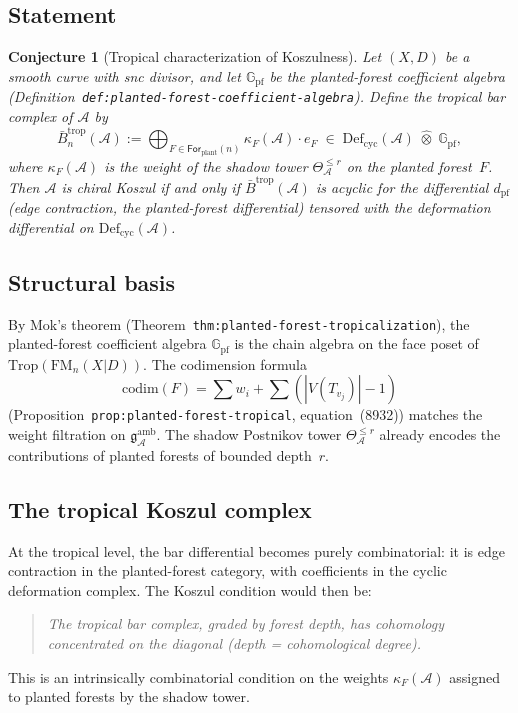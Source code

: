 \documentclass[11pt]{article}
\newcommand{\cA}{\mathcal{A}}
\newcommand{\bG}{\mathbb{G}}
\newcommand{\fg}{\mathfrak{g}}
\newcommand{\FM}{\mathrm{FM}}
\newcommand{\Trop}{\mathrm{Trop}}
\newcommand{\barB}{\bar{B}}
\newcommand{\Def}{\mathrm{Def}}
\theoremstyle{plain}
\newtheorem{conjecture}{Conjecture}[section]
\theoremstyle{definition}
\theoremstyle{remark}
\begin{document}
\subsection{Statement}

\begin{conjecture}[Tropical characterization of Koszulness]
\label{conj:tropical-koszul}
Let $(X,D)$ be a smooth curve with snc divisor, and let
$\bG_{\mathrm{pf}}$ be the planted-forest coefficient algebra
(Definition~\texttt{def:planted-forest-coefficient-algebra}).
Define the \emph{tropical bar complex} of $\cA$ by
\[
\barB^{\mathrm{trop}}_n(\cA)
:= \bigoplus_{F \in \mathsf{For}_{\mathrm{plant}}(n)}
   \kappa_F(\cA) \cdot e_F
\;\in\;
\Def_{\mathrm{cyc}}(\cA) \;\widehat{\otimes}\; \bG_{\mathrm{pf}},
\]
where $\kappa_F(\cA)$ is the weight of the shadow tower
$\Theta^{\leq r}_\cA$ on the planted forest~$F$.
Then $\cA$ is chiral Koszul if and only if
$\barB^{\mathrm{trop}}(\cA)$ is acyclic for the differential
$d_{\mathrm{pf}}$ (edge contraction, the planted-forest differential) tensored with the
deformation differential on $\Def_{\mathrm{cyc}}(\cA)$.
\end{conjecture}

\subsection{Structural basis}

By Mok's theorem (Theorem~\texttt{thm:planted-forest-tropicalization}),
the planted-forest coefficient algebra $\bG_{\mathrm{pf}}$ is the
chain algebra on the face poset of
$\Trop(\FM_n(X|D))$.  The codimension formula
\[
\mathrm{codim}(F) = \sum w_i + \sum(|V(T_{v_j})| - 1)
\]
(Proposition~\texttt{prop:planted-forest-tropical}, equation~(8932))
matches the weight filtration on $\fg^{\mathrm{amb}}_\cA$.
The shadow Postnikov tower $\Theta^{\leq r}_\cA$ already encodes
the contributions of planted forests of bounded depth~$r$.

\subsection{The tropical Koszul complex}

At the tropical level, the bar differential becomes purely
combinatorial: it is edge contraction in the planted-forest
category, with coefficients in the cyclic deformation complex.
The Koszul condition would then be:
\begin{quote}
\emph{The tropical bar complex, graded by forest depth, has
cohomology concentrated on the diagonal (depth = cohomological
degree).}
\end{quote}
This is an intrinsically combinatorial condition on the weights
$\kappa_F(\cA)$ assigned to planted forests by the shadow tower.
\end{document}
